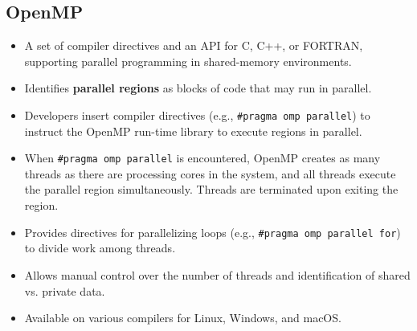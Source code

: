 \subsection{OpenMP}
\begin{itemize}
    \item A set of compiler directives and an API for C, C++, or FORTRAN, supporting parallel programming in shared-memory environments.
    \item Identifies \textbf{parallel regions} as blocks of code that may run in parallel.
    \item Developers insert compiler directives (e.g., \texttt{\#pragma omp parallel}) to instruct the OpenMP run-time library to execute regions in parallel.
    \item When \texttt{\#pragma omp parallel} is encountered, OpenMP creates as many threads as there are processing cores in the system, and all threads execute the parallel region simultaneously. Threads are terminated upon exiting the region.
    \item Provides directives for parallelizing loops (e.g., \texttt{\#pragma omp parallel for}) to divide work among threads.
    \item Allows manual control over the number of threads and identification of shared vs. private data.
    \item Available on various compilers for Linux, Windows, and macOS.
\end{itemize}

